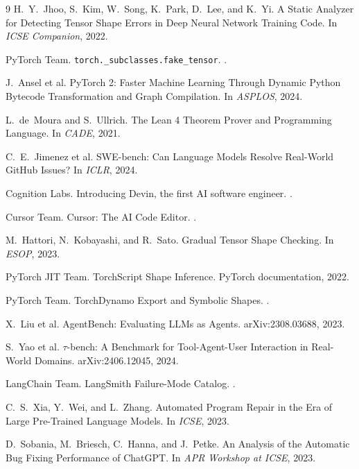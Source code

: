 \documentclass{article}
\begin{document}

\begin{thebibliography}{9}
\small
{}
H.~Y.~Jhoo, S.~Kim, W.~Song, K.~Park, D.~Lee, and K.~Yi.
\newblock A Static Analyzer for Detecting Tensor Shape Errors in Deep Neural
Network Training Code.
\newblock In \emph{ICSE Companion}, 2022.

PyTorch Team.
\newblock \texttt{torch.\_subclasses.fake\_tensor}.
.

J.~Ansel et al.
\newblock PyTorch 2: Faster Machine Learning Through Dynamic Python Bytecode
Transformation and Graph Compilation.
\newblock In \emph{ASPLOS}, 2024.

L.~de~Moura and S.~Ullrich.
\newblock The Lean 4 Theorem Prover and Programming Language.
\newblock In \emph{CADE}, 2021.

C.~E.~Jimenez et al.
\newblock SWE-bench: Can Language Models Resolve Real-World GitHub Issues?
\newblock In \emph{ICLR}, 2024.

Cognition Labs.
\newblock Introducing Devin, the first AI software engineer.
.

Cursor Team.
\newblock Cursor: The AI Code Editor.
.

M.~Hattori, N.~Kobayashi, and R.~Sato.
\newblock Gradual Tensor Shape Checking.
\newblock In \emph{ESOP}, 2023.

PyTorch JIT Team.
\newblock TorchScript Shape Inference.
\newblock PyTorch documentation, 2022.

PyTorch Team.
\newblock TorchDynamo Export and Symbolic Shapes.
.

X.~Liu et al.
\newblock AgentBench: Evaluating LLMs as Agents.
\newblock arXiv:2308.03688, 2023.

S.~Yao et al.
\newblock $\tau$-bench: A Benchmark for Tool-Agent-User Interaction in
Real-World Domains.
\newblock arXiv:2406.12045, 2024.

LangChain Team.
\newblock LangSmith Failure-Mode Catalog.
.

C.~S.~Xia, Y.~Wei, and L.~Zhang.
\newblock Automated Program Repair in the Era of Large Pre-Trained Language Models.
\newblock In \emph{ICSE}, 2023.

D.~Sobania, M.~Briesch, C.~Hanna, and J.~Petke.
\newblock An Analysis of the Automatic Bug Fixing Performance of ChatGPT.
\newblock In \emph{APR Workshop at ICSE}, 2023.
\end{thebibliography}
\end{document}
